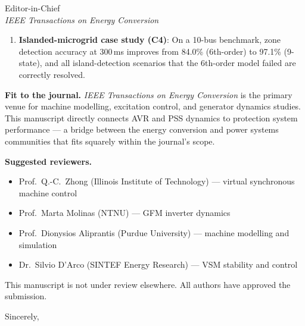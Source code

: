 \documentclass[11pt,a4paper]{letter}
\begin{document}
\begin{letter}{Editor-in-Chief\\
               \textit{IEEE Transactions on Energy Conversion}}
\begin{enumerate}
  \item \textbf{Islanded-microgrid case study (C4)}: On a 10-bus
        benchmark, zone detection accuracy at 300\,ms improves
        from 84.0\% (6th-order) to 97.1\% (9-state), and all
        island-detection scenarios that the 6th-order model
        failed are correctly resolved.
\end{enumerate}

\textbf{Fit to the journal.}
\textit{IEEE Transactions on Energy Conversion} is the primary venue
for machine modelling, excitation control, and generator dynamics
studies.  This manuscript directly connects AVR and PSS dynamics to
protection system performance --- a bridge between the energy
conversion and power systems communities that fits squarely within
the journal's scope.

\textbf{Suggested reviewers.}
\begin{itemize}
  \item Prof.\ Q.-C.\ Zhong (Illinois Institute of Technology)
        — virtual synchronous machine control
  \item Prof.\ Marta Molinas (NTNU) — GFM inverter dynamics
  \item Prof.\ Dionysios Aliprantis (Purdue University)
        — machine modelling and simulation
  \item Dr.\ Silvio D'Arco (SINTEF Energy Research)
        — VSM stability and control
\end{itemize}

This manuscript is not under review elsewhere.  All authors have
approved the submission.

\closing{Sincerely,}
\end{letter}
\end{document}
